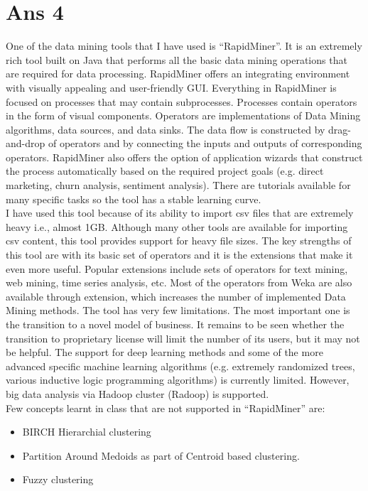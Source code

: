 \documentclass[10pt]{article}
\begin{document}
\section*{Ans 4}
\begin{flushleft}
One of the data mining tools that I have used is ``RapidMiner''. It is an extremely rich tool built on Java that performs all the basic data mining operations that are required for data processing. RapidMiner offers an integrating environment with visually appealing and user-friendly GUI. Everything in RapidMiner is focused on processes that may contain subprocesses.
Processes contain operators in the form of visual components. Operators are implementations of Data Mining algorithms, data sources, and data sinks. The data flow is constructed by drag-and-drop of operators and by connecting the inputs and outputs of corresponding operators. RapidMiner also offers the option of application wizards that construct the process
automatically based on the required project goals (e.g. direct marketing, churn analysis, sentiment analysis). There are tutorials available for many specific tasks so the tool has a stable learning curve.\\
\vspace{0.5em}
I have used this tool because of its ability to import csv files that are extremely heavy i.e., almost 1GB. Although many other tools are available for importing csv content, this tool provides support for heavy file sizes. The key strengths of this tool are with its basic set of operators and it is the extensions that make it even more useful. Popular extensions include sets of operators for text mining, web mining, time series analysis, etc. Most of the operators from Weka are also available through extension, which increases the number of implemented Data Mining methods. The tool has very few limitations. The most important one is the transition to a novel model of business. It remains to be seen whether the transition to proprietary license will limit the number of its users, but it may not be helpful. The support for deep learning methods and some of the more advanced specific machine learning algorithms (e.g. extremely randomized trees, various inductive logic programming algorithms) is currently limited. However, big data analysis via Hadoop cluster (Radoop) is supported.\\
\vspace{0.5em}
Few concepts learnt in class that are not supported in ``RapidMiner'' are:\\
\begin{itemize}
\item BIRCH Hierarchial clustering
\item Partition Around Medoids as part of Centroid based clustering.
\item Fuzzy clustering
\end{itemize}
\end{flushleft}
\end{document}
